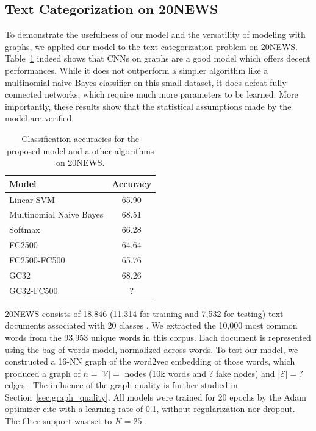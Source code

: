 \documentclass{article}
\newcommand{\V}{\mathcal{V}}
\newcommand{\E}{\mathcal{E}}
\newcommand{\tabref}[1]{Table~\ref{tab:#1}}
\newcommand{\secref}[1]{Section~\ref{sec:#1}}
\newcommand{\todo}[1]{{\color{red} #1 }}
\begin{document}
\subsection{Text Categorization on 20NEWS}

To demonstrate the usefulness of our model and the versatility of modeling with
graphs, we applied our model to the text categorization problem on 20NEWS.
\tabref{20news} indeed shows that CNNs on graphs are a good model which offers
decent performances. While it does not outperform a simpler algorithm like a
multinomial naive Bayes classifier on this small dataset, it does defeat fully
connected networks, which require much more parameters to be learned. More
importantly, these results show that the statistical assumptions made by the
model are verified.

\begin{table}[h!] \centering
\begin{tabular}{lc} \toprule
Model & Accuracy \\
\midrule
Linear SVM & 65.90 \\
Multinomial Naive Bayes & 68.51 \\
Softmax & 66.28 \\
\addlinespace
FC2500 & 64.64 \\
FC2500-FC500 & 65.76 \\
\addlinespace
GC32 & 68.26 \\
GC32-FC500 & \todo{?} \\
\bottomrule \end{tabular}
\caption{Classification accuracies for the proposed model and a other algorithms
on 20NEWS.} 
\label{tab:20news}
\end{table}

20NEWS consists of 18,846 (11,314 for training and 7,532 for testing) text
documents associated with 20 classes \cite{art:Joachims9620NEWS}. We extracted
the 10,000 most common words from the 93,953 unique words in this corpus. Each
document is represented using the bag-of-words model, normalized across words.
To test our model, we constructed a 16-NN graph of the word2vec
\cite{pro:MikolovChenCorradoDean13word2vec} embedding of those words, which
produced a graph of \todo{$n = |\V| = $ nodes (10k words and ? fake nodes) and
$|\E| = ?$ edges}. The influence of the graph quality is further studied in
\secref{graph_quality}. All models were trained for \todo{20 epochs} by the Adam
optimizer \todo{cite} with a learning rate of 0.1, without regularization nor
dropout. The filter support was set to \todo{$K = 25$}.
\end{document}
